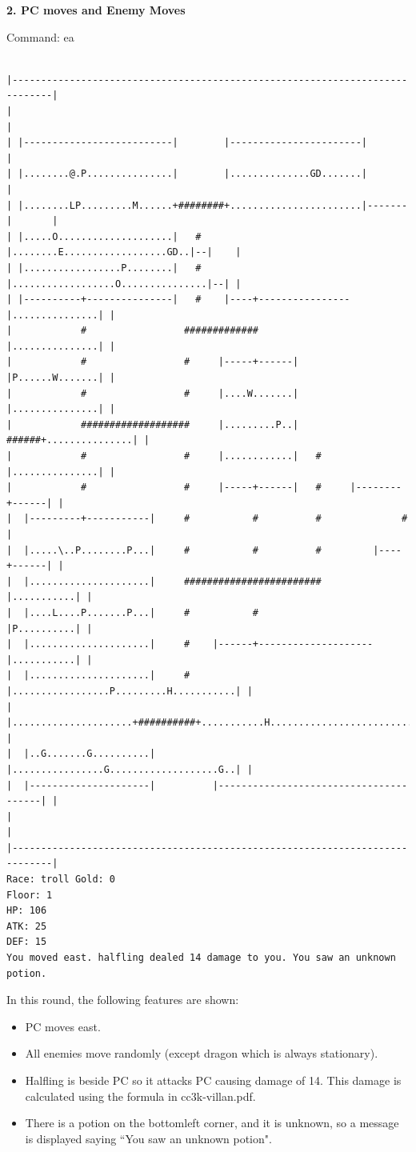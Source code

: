 \documentclass[11pt]{article}
\theoremstyle{plain}
\begin{document}
\newpage
\textbf{2. PC moves and Enemy Moves}

Command: ea
\begin{Verbatim}[fontsize=\scriptsize]

|-----------------------------------------------------------------------------|
|                                                                             |
| |--------------------------|        |-----------------------|               |
| |........@.P...............|        |..............GD.......|               |
| |........LP.........M......+########+.......................|-------|       |
| |.....O....................|   #    |........E..................GD..|--|    |
| |.................P........|   #    |..................O...............|--| |
| |----------+---------------|   #    |----+----------------|...............| |
|            #                 #############                |...............| |
|            #                 #     |-----+------|         |P......W.......| |
|            #                 #     |....W.......|         |...............| |
|            ###################     |.........P..|   ######+...............| |
|            #                 #     |............|   #     |...............| |
|            #                 #     |-----+------|   #     |--------+------| |
|  |---------+-----------|     #           #          #              #        |
|  |.....\..P........P...|     #           #          #         |----+------| |
|  |.....................|     ########################         |...........| |
|  |....L....P.......P...|     #           #                    |P..........| |
|  |.....................|     #    |------+--------------------|...........| |
|  |.....................|     #    |.................P.........H...........| |
|  |.....................+##########+...........H...........................| |
|  |..G.......G..........|          |................G...................G..| |
|  |---------------------|          |---------------------------------------| |
|                                                                             |
|-----------------------------------------------------------------------------|
Race: troll Gold: 0                                                    Floor: 1
HP: 106
ATK: 25
DEF: 15
You moved east. halfling dealed 14 damage to you. You saw an unknown potion. 
\end{Verbatim}

In this round, the following features are shown:
\begin{itemize}
	\item PC moves east.
	\item All enemies move randomly (except dragon which is always stationary).
	\item Halfling is beside PC so it attacks PC causing damage of 14.
		This damage is calculated using the formula in cc3k-villan.pdf.
	\item There is a potion on the bottomleft corner, and it is unknown, so a 
		message is displayed saying ``You saw an unknown potion". 
\end{itemize}
\end{document}
